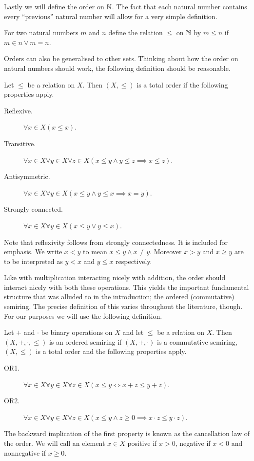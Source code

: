 \documentclass[../main.tex]{subfiles}
\begin{document}
Lastly we will define the order on $\mathbb{N}$. The fact that each natural number contains every ``previous'' natural number will allow for a very simple definition.
\begin{definition}\label{dfn:the_natural_numbers_integers_and_rational_numbers:N_order}
    For two natural numbers $m$ and $n$ define the relation $\leq$ on $\mathbb{N}$ by $m\leq n$ if $m\in n\lor m=n$.
\end{definition}
Orders can also be generalised to other sets. Thinking about how the order on natural numbers should work, the following definition should be reasonable.
\begin{definition}
    Let $\leq$ be a relation on $X$. Then $(X,\leq)$ is a total order if the following properties apply.
    \begin{description}
        \item[Reflexive.] $\forall x\in X(x\leq x)$.
        \item[Transitive.] $\forall x\in X\forall y\in X\forall z\in X(x\leq y\land y\leq z\implies x\leq z)$.
        \item[Antisymmetric.] $\forall x\in X\forall y\in X(x\leq y\land y\leq x\implies x=y)$.
        \item[Strongly connected.] $\forall x\in X\forall y\in X(x\leq y\lor y\leq x)$.
    \end{description}
    Note that reflexivity follows from strongly connectedness. It is included for emphasis. We write $x<y$ to mean $x\leq y\land x\neq y$. Moreover $x>y$ and $x\geq y$ are to be interpreted as $y<x$ and $y\leq x$ respectively.
\end{definition}
Like with multiplication interacting nicely with addition, the order should interact nicely with both these operations. This yields the important fundamental structure that was alluded to in the introduction; the ordered (commutative) semiring. The precise definition of this varies throughout the literature, though. For our purposes we will use the following definition.
\begin{definition}
    Let $+$ and $\cdot$ be binary operations on $X$ and let $\leq$ be a relation on $X$. Then $(X,+,\cdot,\leq)$ is an ordered semiring if $(X,+,\cdot)$ is a commutative semiring, $(X,\leq)$ is a total order and the following properties apply.
    \begin{description}
        \item[OR1.] $\forall x\in X\forall y\in X\forall z\in X(x\leq y\iff x+z\leq y+z)$.
        \item[OR2.] $\forall x\in X\forall y\in X\forall z\in X(x\leq y\land z\geq0\implies x\cdot z\leq y\cdot z)$.
    \end{description}
    The backward implication of the first property is known as the cancellation law of the order. We will call an element $x\in X$ positive if $x>0$, negative if $x<0$ and nonnegative if $x\geq0$.
\end{definition}
\end{document}
